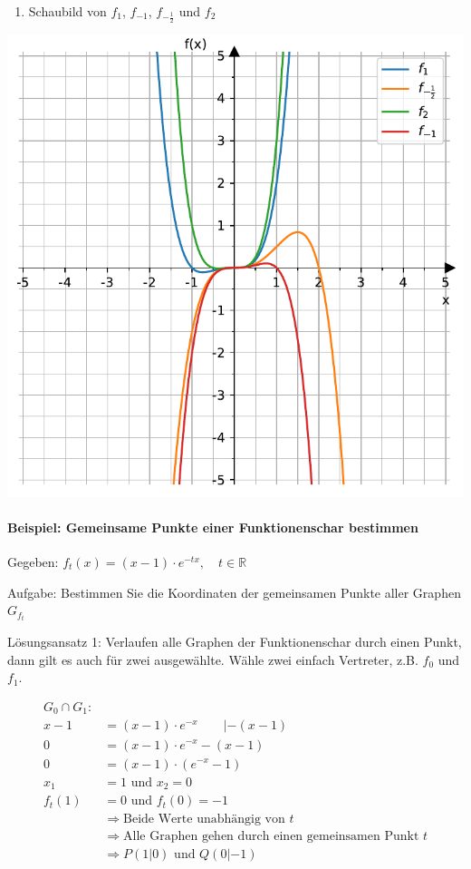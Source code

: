 \documentclass[
  letterpaper,
  DIV=11,
  numbers=noendperiod]{scrartcl}
\let\oldparagraph\paragraph
\renewcommand{\paragraph}[1]{\oldparagraph{#1}\mbox{}}
\providecommand{\tightlist}{%
  \setlength{\itemsep}{0pt}\setlength{\parskip}{0pt}}\usepackage{longtable,booktabs,array}
\begin{document}
\begin{enumerate}
\def\labelenumi{\arabic{enumi}.}
\setcounter{enumi}{3}
\tightlist
\item
  Schaubild von \(f_1\), \(f_{{-1}}\), \(f_{-\frac{1}{2}}\) und \(f_2\)
\end{enumerate}

\includegraphics{8_Funktionsscharen_files/figure-pdf/cell-2-output-1.pdf}

\paragraph{Beispiel: Gemeinsame Punkte einer Funktionenschar
bestimmen}\label{beispiel-gemeinsame-punkte-einer-funktionenschar-bestimmen}

Gegeben: \(f_t(x)= (x-1)\cdot e^{-tx}, \quad t \in \mathbb{R}\)

Aufgabe: Bestimmen Sie die Koordinaten der gemeinsamen Punkte aller
Graphen \(G_{f_t}\)

Lösungsansatz 1: Verlaufen alle Graphen der Funktionenschar durch einen
Punkt, dann gilt es auch für zwei ausgewählte. Wähle zwei einfach
Vertreter, z.B. \(f_0\) und \(f_1\).

\[
\begin{aligned}
G_0 \cap G_1:&\\
x-1 &= (x-1) \cdot e^{-x} \qquad |-(x-1)\\
0 &= (x-1) \cdot e^{-x} - (x-1) \\
0 &= (x-1)\cdot (e^{-x}-1)\\
x_1 &= 1 \text{ und } x_2=0\\
f_t(1) &= 0 \text{ und } f_t(0)=-1\\
& \Rightarrow \text{Beide Werte unabhängig von }t\\ 
& \Rightarrow \text{Alle Graphen gehen durch einen gemeinsamen Punkt }t\\
& \Rightarrow P(1|0) \text { und } Q(0|-1)  
\end{aligned}
\]
\end{document}
